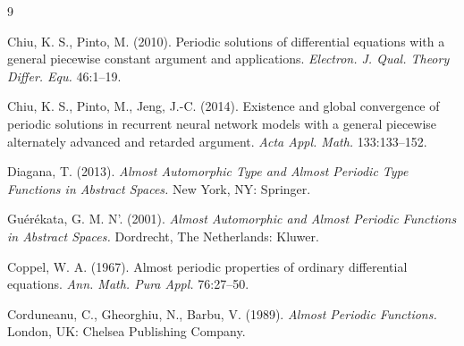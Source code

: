 \documentclass[english,reqno]{amsart}
\numberwithin{equation}{section}
\theoremstyle{plain}
\theoremstyle{definition}
\theoremstyle{remark}
\begin{document}
\begin{thebibliography}{9}








Chiu, K. S., Pinto, M. (2010).
Periodic solutions of differential equations with a general piecewise
constant argument and applications.
{\it Electron. J. Qual. Theory Differ. Equ.} 46:1--19.

Chiu, K. S., Pinto, M., Jeng, J.-C. (2014). 
Existence and global convergence of periodic solutions
in recurrent neural network models with a general piecewise alternately advanced and
retarded argument.
{\it Acta Appl. Math.} 133:133--152.

Diagana, T. (2013).
{\it Almost Automorphic Type and Almost Periodic Type Functions in Abstract Spaces.} New York, NY:
Springer.

Gu\' er\' ekata, G. M. N'. (2001).
{\it Almost Automorphic and Almost Periodic Functions
in Abstract Spaces.} Dordrecht, The Netherlands:
Kluwer.

Coppel, W. A. (1967).
Almost periodic properties of ordinary differential equations.
{\it Ann. Math. Pura Appl.} 76:27--50.

Corduneanu, C.,  Gheorghiu, N., Barbu, V. (1989).
{\it  Almost Periodic Functions.}
London, UK: Chelsea Publishing Company.


\end{thebibliography}
\end{document}
